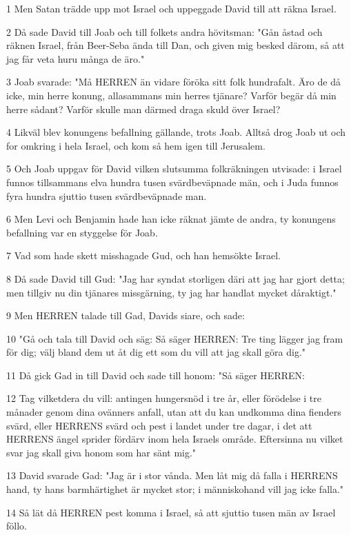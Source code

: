 \par 1 Men Satan trädde upp mot Israel och uppeggade David till att räkna Israel.
\par 2 Då sade David till Joab och till folkets andra hövitsman: "Gån åstad och räknen Israel, från Beer-Seba ända till Dan, och given mig besked därom, så att jag får veta huru många de äro."
\par 3 Joab svarade: "Må HERREN än vidare föröka sitt folk hundrafalt. Äro de då icke, min herre konung, allasammans min herres tjänare? Varför begär då min herre sådant? Varför skulle man därmed draga skuld över Israel?
\par 4 Likväl blev konungens befallning gällande, trots Joab. Alltså drog Joab ut och for omkring i hela Israel, och kom så hem igen till Jerusalem.
\par 5 Och Joab uppgav för David vilken slutsumma folkräkningen utvisade: i Israel funnos tillsammans elva hundra tusen svärdbeväpnade män, och i Juda funnos fyra hundra sjuttio tusen svärdbeväpnade man.
\par 6 Men Levi och Benjamin hade han icke räknat jämte de andra, ty konungens befallning var en styggelse för Joab.
\par 7 Vad som hade skett misshagade Gud, och han hemsökte Israel.
\par 8 Då sade David till Gud: "Jag har syndat storligen däri att jag har gjort detta; men tillgiv nu din tjänares missgärning, ty jag har handlat mycket dåraktigt."
\par 9 Men HERREN talade till Gad, Davids siare, och sade:
\par 10 "Gå och tala till David och säg: Så säger HERREN: Tre ting lägger jag fram för dig; välj bland dem ut åt dig ett som du vill att jag skall göra dig."
\par 11 Då gick Gad in till David och sade till honom: "Så säger HERREN:
\par 12 Tag vilketdera du vill: antingen hungersnöd i tre år, eller förödelse i tre månader genom dina ovänners anfall, utan att du kan undkomma dina fienders svärd, eller HERRENS svärd och pest i landet under tre dagar, i det att HERRENS ängel sprider fördärv inom hela Israels område. Eftersinna nu vilket svar jag skall giva honom som har sänt mig."
\par 13 David svarade Gad: "Jag är i stor vånda. Men låt mig då falla i HERRENS hand, ty hans barmhärtighet är mycket stor; i människohand vill jag icke falla."
\par 14 Så lät då HERREN pest komma i Israel, så att sjuttio tusen män av Israel föllo.
